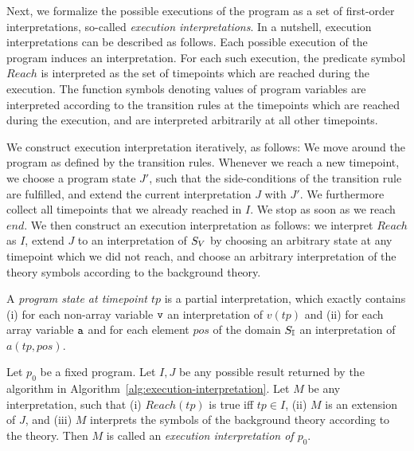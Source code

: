 Next, we formalize the possible executions of the program as a set of first-order interpretations, so-called \emph{execution interpretations}.
%
In a nutshell, execution interpretations can be described as follows.
%
Each possible execution of the program induces an interpretation. 
For each such execution, the predicate symbol $\mathit{Reach}$ is interpreted as the set of timepoints which are reached during the execution. 
%
The function symbols denoting values of program variables are interpreted according to the transition rules at the timepoints which are reached during the execution, and are interpreted arbitrarily at all other timepoints.


We construct execution interpretation iteratively, as follows: 
We move around the program as defined by the transition rules. 
Whenever we reach a new timepoint, we choose a program state $J'$,
such that the side-conditions of the transition rule are fulfilled,
and extend the current interpretation $J$ with $J'$. We furthermore collect all timepoints that we already reached in $I$. We stop as soon as we reach $\mathit{end}$. We then construct an execution interpretation as follows: we interpret $Reach$ as $I$, extend $J$ to an interpretation of $S_V$ by choosing an arbitrary state at any timepoint which we did not reach, and choose an arbitrary interpretation of the theory symbols according to the background theory.

\begin{definition}
	A \emph{program state at timepoint $tp$} is a partial interpretation, which exactly contains (i) for each non-array variable $\texttt{v}$ an interpretation of $v(tp)$ and (ii) for each array variable $\texttt{a}$ and for each element $pos$ of the domain $S_{\mathbb{I}}$ an interpretation of $a(tp,pos)$.
\end{definition}

\begin{definition}
	\label{def:execution-interpretation} 
	Let $p_0$ be a fixed program.
	Let $I,J$ be any possible result returned by the algorithm in Algorithm~\ref{alg:execution-interpretation}.
	Let $M$ be any interpretation, such that 
	(i) $\mathit{Reach}(tp)$ is true iff $tp \in I$, 
	(ii) $M$ is an extension of $J$, and 
	(iii) $M$ interprets the symbols of the background theory according to the theory. 
	Then $M$ is called an \emph{execution interpretation of $p_0$}.
\end{definition}



